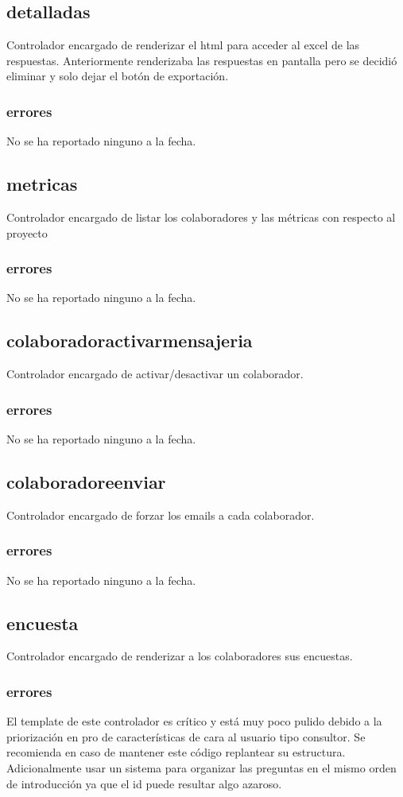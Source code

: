 \documentclass[10pt,a4paper]{book}
\begin{document}
	\subsection{detalladas}
	Controlador encargado de renderizar el html para acceder al excel de las respuestas. Anteriormente renderizaba las respuestas en pantalla pero se decidió eliminar y solo dejar el botón  de exportación.
	\subsubsection{errores}
	No se ha reportado ninguno a la fecha.
	
	\subsection{metricas}
	Controlador encargado de listar los colaboradores y las métricas con respecto al proyecto
	\subsubsection{errores}
	No se ha reportado ninguno a la fecha.
	
	\subsection{colaboradoractivarmensajeria}
	Controlador encargado de activar/desactivar un colaborador.
	\subsubsection{errores}
	No se ha reportado ninguno a la fecha.
	
	\subsection{colaboradoreenviar}
	Controlador encargado de forzar los emails a cada colaborador.
	\subsubsection{errores}
	No se ha reportado ninguno a la fecha.
	
	\subsection{encuesta}
	Controlador encargado de renderizar a los colaboradores sus encuestas.
	\subsubsection{errores}
	El template de este controlador es crítico y está muy poco pulido debido a la priorización en pro de características de cara al usuario tipo consultor. Se recomienda en caso de mantener este código replantear su estructura. Adicionalmente usar un sistema para organizar las preguntas en el mismo orden de introducción ya que el id puede resultar algo azaroso.
	
\end{document}
